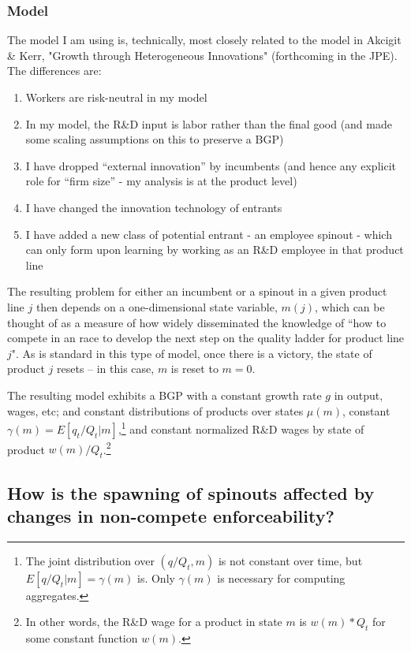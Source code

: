 \documentclass[12pt,english]{article}
\theoremstyle{remark}
\begin{document}
\subsubsection{Model}

The model I am using is, technically, most closely related to the model in Akcigit \& Kerr, "Growth through Heterogeneous Innovations" (forthcoming in the JPE). The differences are:
\begin{enumerate}
	\item Workers are risk-neutral in my model
	\item In my model, the R\&D input is labor rather than the final good (and made some scaling assumptions on this to preserve a BGP)
	\item I have dropped ``external innovation'' by incumbents (and hence any explicit role for ``firm size'' - my analysis is at the product level)
	\item I have changed the innovation technology of entrants
	\item I have added a new class of potential entrant - an employee spinout - which can only form upon learning by working as an R\&D employee in that product line
\end{enumerate}

The resulting problem for either an incumbent or a spinout in a given product line $j$ then depends on a one-dimensional state variable, $m(j)$, which can be thought of as a measure of how widely disseminated the knowledge of ``how to compete in an race to develop the next step on the quality ladder for product line $j$". As is standard in this type of model, once there is a victory, the state of product $j$ resets -- in this case, $m$ is reset to $m = 0$. 

The resulting model exhibits a BGP with a constant growth rate $g$ in output, wages, etc; and constant distributions of products over states $\mu(m)$, constant $\gamma(m) = E[q_t / Q_t | m]$,\footnote{The joint distribution over $(q/Q_t,m)$ is not constant over time, but $E[q/Q_t | m] = \gamma(m)$ is. Only $\gamma(m)$ is necessary for computing aggregates.} and constant normalized R\&D wages by state of product $w(m) / Q_t$.\footnote{In other words, the R\&D wage for a product in state $m$ is $w(m) * Q_t$ for some constant function $w(m)$.} 


\subsection{How is the spawning of spinouts affected by changes in non-compete enforceability?}
\end{document}
